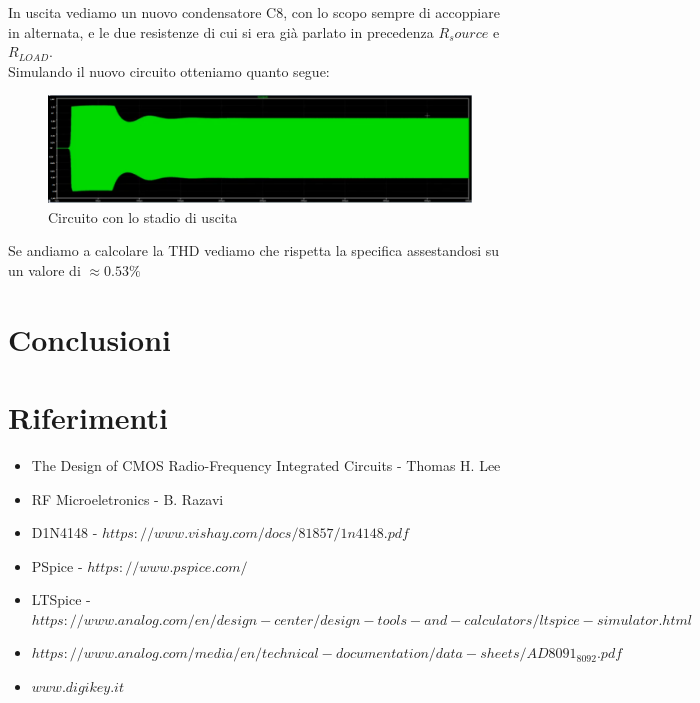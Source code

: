 \documentclass{article}
\begin{document}
In uscita vediamo un nuovo condensatore C8, con lo scopo sempre di accoppiare in alternata, e le due resistenze di cui si era già parlato in precedenza $R_source$ e $R_{LOAD}$.\\Simulando il nuovo circuito otteniamo quanto segue:
~\begin{figure}[H]
\includegraphics[width=\textwidth]{SimulazioneFinaleTempo}
\centering
\caption{Circuito con lo stadio di uscita}
\label{fig:foo}
\end{figure}
Se andiamo a calcolare la THD vediamo che rispetta la specifica assestandosi su un valore di $ \approx 0.53\% $
\newpage

\section{Conclusioni}

\newpage
\section{Riferimenti}

\begin{itemize}
\item The Design of CMOS Radio-Frequency Integrated Circuits - Thomas H. Lee
\item RF Microeletronics - B. Razavi
\item D1N4148 - $https://www.vishay.com/docs/81857/1n4148.pdf$
\item PSpice - $https://www.pspice.com/$
\item LTSpice - $https://www.analog.com/en/design-center/design-tools-and-calculators/ltspice-simulator.html$
\item $https://www.analog.com/media/en/technical-documentation/data-sheets/AD8091_8092.pdf$
\item $www.digikey.it$
\end{itemize}
\end{document}
